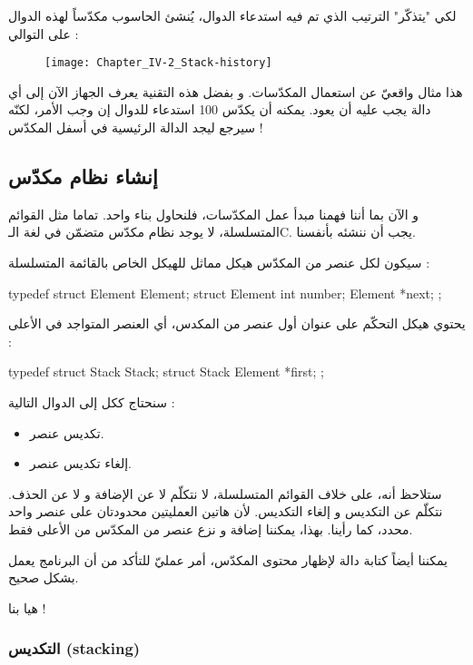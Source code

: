 لكي "يتذكّر" الترتيب الذي تم فيه استدعاء الدوال، يُنشئ الحاسوب مكدّساً لهذه الدوال على التوالي :

\begin{figure}[H]
	\centering
	\texttt{[image: Chapter\_IV-2\_Stack-history]}
\end{figure}

هذا مثال واقعيّ عن استعمال المكدّسات. و بفضل هذه التقنية يعرف الجهاز الآن إلى أي دالة يجب عليه أن يعود. يمكنه أن يكدّس 100 استدعاء للدوال إن وجب الأمر، لكنّه سيرجع ليجد الدالة الرئيسية في أسفل المكدّس !

\subsection{إنشاء نظام مكدّس}

و الآن بما أننا فهمنا مبدأ عمل المكدّسات، فلنحاول بناء واحد. تماما مثل القوائم المتسلسلة، لا يوجد نظام مكدّس متضمّن في لغة الـ\textenglish{C}.
يجب أن ننشئه بأنفسنا.

سيكون لكل عنصر من المكدّس هيكل مماثل للهيكل الخاص بالقائمة المتسلسلة :

\begin{Csource}
typedef struct Element Element;
struct Element
{
	int number;
	Element *next;
};
\end{Csource}

يحتوي هيكل التحكّم على عنوان أول عنصر من المكدس، أي العنصر المتواجد في الأعلى :

\begin{Csource}
typedef struct Stack Stack;
struct Stack
{
	Element *first;
};
\end{Csource}

سنحتاج ككل إلى الدوال التالية :

\begin{itemize}
	\item تكديس  عنصر.
	\item إلغاء تكديس عنصر.
\end{itemize}

ستلاحظ أنه، على خلاف القوائم المتسلسلة، لا نتكلّم لا عن الإضافة و لا عن الحذف. نتكلّم عن التكديس و إلغاء التكديس. لأن هاتين العمليتين محدودتان على عنصر واحد محدد، كما رأينا. بهذا، يمكننا إضافة و نزع عنصر من المكدّس من الأعلى فقط.

يمكننا أيضاً كتابة دالة لإظهار محتوى المكدّس، أمر عمليّ للتأكد من أن البرنامج يعمل بشكل صحيح.

هيا بنا  !

\subsubsection{التكديس (\textenglish{stacking})}

